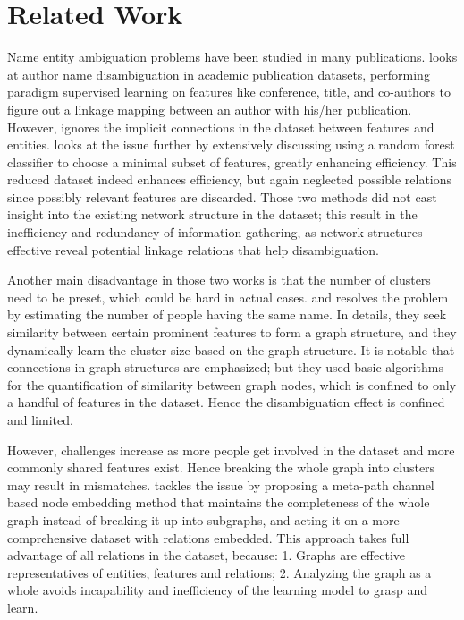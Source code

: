 \documentclass[sigconf, nonacm]{acmart}
\begin{document}
\section{Related Work}
Name entity ambiguation problems have been studied in many publications. \cite{hg04} looks at author name disambiguation in academic publication datasets, performing paradigm supervised learning on features like conference, title, and co-authors to figure out a linkage mapping between an author with his/her publication. However, \cite{hg04} ignores the implicit connections in the dataset between features and entities. \cite{tpgl09} looks at the issue further by extensively discussing using a random forest classifier to choose a minimal subset of features, greatly enhancing efficiency. This reduced dataset indeed enhances efficiency, but again neglected possible relations since possibly relevant features are discarded. Those two methods did not cast insight into the existing network structure in the dataset; this result in the inefficiency and redundancy of information gathering, as network structures effective reveal potential linkage relations that help disambiguation.

Another main disadvantage in those two works is that the number of clusters need to be preset, which could be hard in actual cases. \cite{zwtf12} and \cite{zzyt18} resolves the problem by estimating the number of people having the same name. In details, they seek similarity between certain prominent features to form a graph structure, and they dynamically learn the cluster size based on the graph structure. It is notable that connections in graph structures are emphasized; but they used basic algorithms for the quantification of similarity between graph nodes, which is confined to only a handful of features in the dataset. Hence the disambiguation effect is confined and limited.

However, challenges increase as more people get involved in the dataset and more commonly shared features exist. Hence breaking the whole graph into clusters may result in mismatches. \cite{wwwljzw20} tackles the issue by proposing a meta-path channel based node embedding method that maintains the completeness of the whole graph instead of breaking it up into subgraphs, and acting it on a more comprehensive dataset with relations embedded. This approach takes full advantage of all relations in the dataset, because: 1. Graphs are effective representatives of entities, features and relations; 2. Analyzing the graph as a whole avoids incapability and inefficiency of the learning model to grasp and learn.
\end{document}
